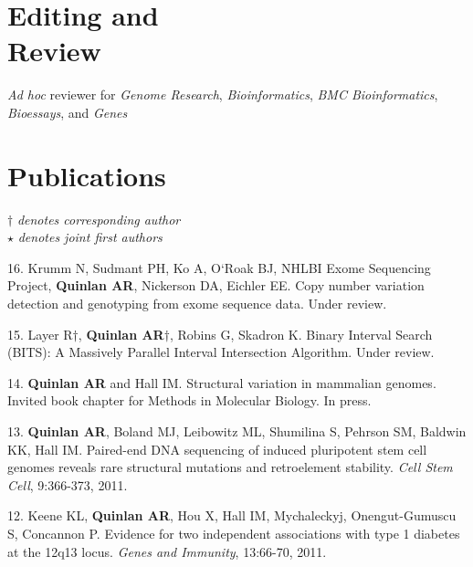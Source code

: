 \documentclass[margin,line]{cv}
\begin{document}
\begin{resume}
    \section{\mysidestyle Editing and\\Review} 
    
    \textit{Ad hoc} reviewer for \textit{Genome Research}, \textit{Bioinformatics}, \textit{BMC Bioinformatics}, 
    \textit{Bioessays}, and \textit{Genes}\\
    \section{\mysidestyle Publications}
    $\dagger$\textit{ denotes corresponding author}\\
    $\star$\textit{ denotes joint first authors}

    \begin{list}{*}{}
    \item[16.] Krumm N, Sudmant PH, Ko A, O`Roak BJ, NHLBI Exome Sequencing Project, 
    \textbf{Quinlan AR}, Nickerson DA, Eichler EE. 
    Copy number variation detection and genotyping from exome sequence data. Under review.
    
    \item[15.] Layer R$\dagger$, \textbf{Quinlan AR}$\dagger$, Robins G, Skadron K. 
    Binary Interval Search (BITS): A Massively Parallel Interval Intersection Algorithm. 
    Under review.
    
    \item[14.] \textbf{Quinlan AR} and Hall IM. 
    Structural variation in mammalian genomes. Invited book chapter for Methods in Molecular Biology.
    In press.
   
    \item[13.] \textbf{Quinlan AR}, Boland MJ, Leibowitz ML, Shumilina S, Pehrson SM, Baldwin KK, Hall IM. 
    Paired-end DNA sequencing of induced pluripotent stem cell genomes reveals rare structural mutations and retroelement stability. 
    \textit{Cell Stem Cell}, 9:366-373, 2011.
    
    \item[12.] Keene KL, \textbf{Quinlan AR}, Hou X, Hall IM, Mychaleckyj, Onengut-Gumuscu S, Concannon P.
    Evidence for two independent associations with type 1 diabetes at the 12q13 locus. 
    \textit{Genes and Immunity}, 13:66-70, 2011.
    

\end{list}
\end{resume}
\end{document}
